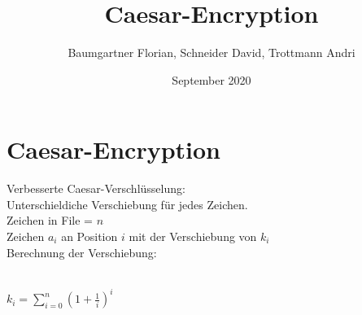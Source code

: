 \documentclass{article}
\title{Caesar-Encryption}
\author{Baumgartner Florian, Schneider David, Trottmann Andri }
\date{September 2020}
\begin{document}
\section{Caesar-Encryption}
Verbesserte Caesar-Verschlüsselung:
\\
Unterschieldiche Verschiebung für jedes Zeichen.
\\
Zeichen in File = $n$\\
Zeichen $a_i$ an Position $i$ mit der Verschiebung von $k_i$
\\
Berechnung der Verschiebung:

\\
\center $k_i =  \sum_{i=0}^n(1+\frac{1}{i})^i$
\flushleft
\end{document}
